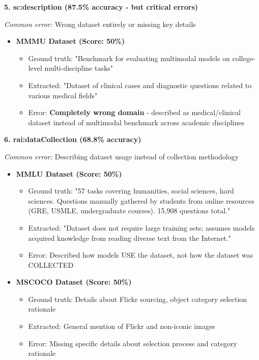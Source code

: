 \documentclass[11pt,a4paper]{article}
\begin{document}
\textbf{5. sc:description (87.5\% accuracy - but critical errors)}

\textit{Common error:} Wrong dataset entirely or missing key details

\begin{itemize}[leftmargin=*]
    \item \textbf{MMMU Dataset (Score: 50\%)}
    \begin{itemize}
        \item Ground truth: "Benchmark for evaluating multimodal models on college-level multi-discipline tasks"
        \item Extracted: "Dataset of clinical cases and diagnostic questions related to various medical fields"
        \item Error: \textbf{Completely wrong domain} - described as medical/clinical dataset instead of multimodal benchmark across academic disciplines
    \end{itemize}
\end{itemize}

\textbf{6. rai:dataCollection (68.8\% accuracy)}

\textit{Common error:} Describing dataset usage instead of collection methodology

\begin{itemize}[leftmargin=*]
    \item \textbf{MMLU Dataset (Score: 50\%)}
    \begin{itemize}
        \item Ground truth: "57 tasks covering humanities, social sciences, hard sciences. Questions manually gathered by students from online resources (GRE, USMLE, undergraduate courses). 15,908 questions total."
        \item Extracted: "Dataset does not require large training sets; assumes models acquired knowledge from reading diverse text from the Internet."
        \item Error: Described how models USE the dataset, not how the dataset was COLLECTED
    \end{itemize}

    \item \textbf{MSCOCO Dataset (Score: 50\%)}
    \begin{itemize}
        \item Ground truth: Details about Flickr sourcing, object category selection rationale
        \item Extracted: General mention of Flickr and non-iconic images
        \item Error: Missing specific details about selection process and category rationale
    \end{itemize}
\end{itemize}
\end{document}
